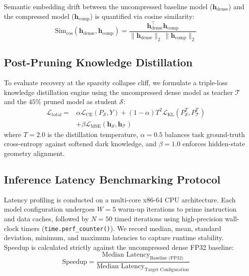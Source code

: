 \documentclass[conference]{IEEEtran}
\begin{document}
Semantic embedding drift between the uncompressed baseline model ($\mathbf{h}_{\text{dense}}$) and the compressed model ($\mathbf{h}_{\text{comp}}$) is quantified via cosine similarity:
\begin{equation}
\text{Sim}_{\cos}(\mathbf{h}_{\text{dense}}, \mathbf{h}_{\text{comp}}) = \frac{\mathbf{h}_{\text{dense}}^\top \mathbf{h}_{\text{comp}}}{\|\mathbf{h}_{\text{dense}}\|_2 \, \|\mathbf{h}_{\text{comp}}\|_2}
\label{eq:cosine_sim}
\end{equation}

\subsection{Post-Pruning Knowledge Distillation}
To evaluate recovery at the sparsity collapse cliff, we formulate a triple-loss knowledge distillation engine using the uncompressed dense model as teacher $\mathcal{T}$ and the $45\%$ pruned model as student $\mathcal{S}$:
\begin{equation}
\begin{split}
\mathcal{L}_{\text{total}} = {} & \alpha \mathcal{L}_{\text{CE}}(P_\mathcal{S}, Y) + (1-\alpha) T^2 \mathcal{L}_{\text{KL}}(P_\mathcal{S}^T, P_\mathcal{T}^T) \\
& + \beta \mathcal{L}_{\text{MSE}}(\mathbf{h}_\mathcal{S}, \mathbf{h}_\mathcal{T})
\end{split}
\label{eq:distillation}
\end{equation}
where $T=2.0$ is the distillation temperature, $\alpha=0.5$ balances task ground-truth cross-entropy against softened dark knowledge, and $\beta=1.0$ enforces hidden-state geometry alignment.

\subsection{Inference Latency Benchmarking Protocol}
Latency profiling is conducted on a multi-core x86-64 CPU architecture. Each model configuration undergoes $W=5$ warm-up iterations to prime instruction and data caches, followed by $N=50$ timed iterations using high-precision wall-clock timers (\texttt{time.perf\_counter()}). We record median, mean, standard deviation, minimum, and maximum latencies to capture runtime stability. Speedup is calculated strictly against the uncompressed dense FP32 baseline:
\begin{equation}
\text{Speedup} = \frac{\text{Median Latency}_{\text{Baseline (FP32)}}}{\text{Median Latency}_{\text{Target Configuration}}}
\label{eq:speedup}
\end{equation}
\end{document}
